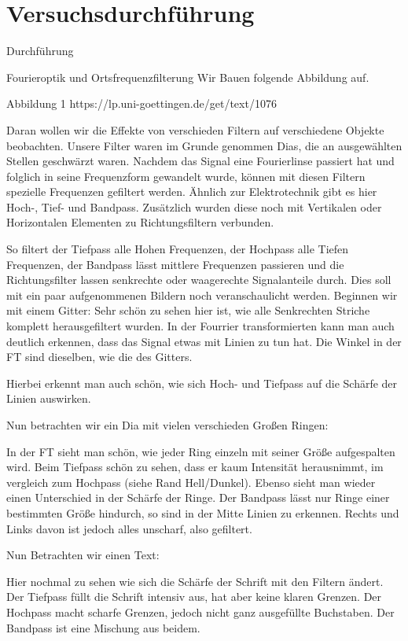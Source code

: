 \chapter{Versuchsdurchführung}
Durchführung

Fourieroptik und Ortsfrequenzfilterung
Wir Bauen folgende Abbildung auf.

Abbildung 1 https://lp.uni-goettingen.de/get/text/1076

Daran wollen wir die Effekte von verschieden Filtern auf verschiedene Objekte beobachten.
Unsere Filter waren im Grunde genommen Dias, die an ausgewählten Stellen geschwärzt waren.
Nachdem das Signal eine Fourierlinse passiert hat und folglich in seine Frequenzform gewandelt wurde, können mit diesen Filtern spezielle Frequenzen gefiltert werden.
Ähnlich zur Elektrotechnik gibt es hier Hoch-, Tief- und Bandpass. 
Zusätzlich wurden diese noch mit Vertikalen oder Horizontalen Elementen zu Richtungsfiltern verbunden.

So filtert der Tiefpass alle Hohen Frequenzen, der Hochpass alle Tiefen Frequenzen, der Bandpass lässt mittlere Frequenzen passieren und die Richtungsfilter lassen senkrechte oder waagerechte Signalanteile durch.
Dies soll mit ein paar aufgenommenen Bildern noch veranschaulicht werden.
Beginnen wir mit einem Gitter:
Sehr schön zu sehen hier ist, wie alle Senkrechten Striche komplett herausgefiltert wurden.
In der Fourrier transformierten kann man auch deutlich erkennen, dass das Signal etwas mit Linien zu tun hat. Die Winkel in der FT sind dieselben, wie die des Gitters.

Hierbei erkennt man auch schön, wie sich Hoch- und Tiefpass auf die Schärfe der Linien auswirken. 

Nun betrachten wir ein Dia mit vielen verschieden Großen Ringen:


In der FT sieht man schön, wie jeder Ring einzeln mit seiner Größe aufgespalten wird. Beim Tiefpass schön zu sehen, dass er kaum Intensität herausnimmt, im vergleich zum Hochpass (siehe Rand Hell/Dunkel). Ebenso sieht man wieder einen Unterschied in der Schärfe der Ringe. Der Bandpass lässt nur Ringe einer bestimmten Größe hindurch, so sind in der Mitte Linien zu erkennen. Rechts und Links davon ist jedoch alles unscharf, also gefiltert.

Nun Betrachten wir einen Text:


Hier nochmal zu sehen wie sich die Schärfe der Schrift mit den Filtern ändert. Der Tiefpass füllt die Schrift intensiv aus, hat aber keine klaren Grenzen. Der Hochpass macht scharfe Grenzen, jedoch nicht ganz ausgefüllte Buchstaben. Der Bandpass ist eine Mischung aus beidem.

